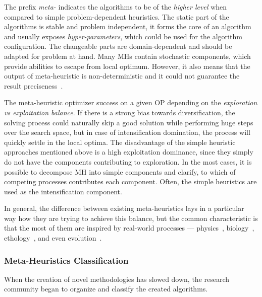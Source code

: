 The prefix \emph{meta-} indicates the algorithms to be of the \textit{higher level} when compared to simple problem-dependent heuristics. The static part of the algorithms is stable and problem independent, it forms the core of an algorithm and usually exposes \textit{hyper-parameters}, which could be used for the algorithm configuration. The changeable parts are domain-dependent and should be adapted for problem at hand. Many MHs contain stochastic components, which provide abilities to escape from local optimum. However, it also means that the output of meta-heuristic is non-deterministic and it could not guarantee the result preciseness~\cite{boussaid2013survey}.

The meta-heuristic optimizer success on a given OP depending on the \textit{exploration vs exploitation balance}. If there is a strong bias towards diversification, the solving process could naturally skip a good solution while performing huge steps over the search space, but in case of intensification domination, the process will quickly settle in the local optima. The disadvantage of the simple heuristic approaches mentioned above is a high exploitation dominance, since they simply do not have the components contributing to exploration. In the most cases, it is possible to decompose MH into simple components and clarify, to which of competing processes contributes each component. Often, the simple heuristics are used as the intensification component.

In general, the difference between existing meta-heuristics lays in a particular way how they are trying to achieve this balance, but the common characteristic is that the most of them are inspired by real-world processes — physics~\cite{van1987simulated}, biology~\cite{sastry2005genetic}, ethology~\cite{teodorovic2006bee,dorigo2007ant,salcedo2014coral}, and even evolution~\cite{beyer2002evolution,eiben2015evolutionary}.


\subsubsection{Meta-Heuristics Classification}
When the creation of novel methodologies has slowed down, the research community began to organize and classify the created algorithms.

